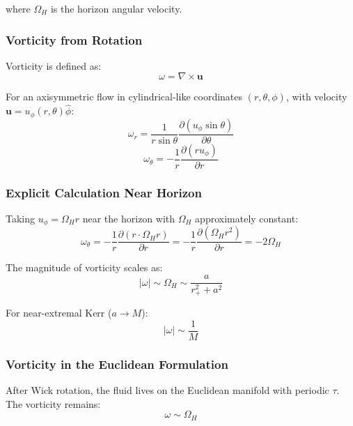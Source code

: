 \documentclass[11pt]{article}
\begin{document}
where $\Omega_H$ is the horizon angular velocity.

\subsubsection{Vorticity from Rotation}

Vorticity is defined as:
\begin{equation}
\omega = \nabla \times \mathbf{u}
\end{equation}

For an axisymmetric flow in cylindrical-like coordinates $(r, \theta, \phi)$, with velocity $\mathbf{u} = u_\phi(r,\theta)\hat{\phi}$:
\begin{equation}
\omega_r = \frac{1}{r\sin\theta}\frac{\partial(u_\phi \sin\theta)}{\partial\theta}
\end{equation}
\begin{equation}
\omega_\theta = -\frac{1}{r}\frac{\partial(r u_\phi)}{\partial r}
\end{equation}

\subsubsection{Explicit Calculation Near Horizon}

Taking $u_\phi = \Omega_H r$ near the horizon with $\Omega_H$ approximately constant:
\begin{equation}
\omega_\theta = -\frac{1}{r}\frac{\partial(r \cdot \Omega_H r)}{\partial r} = -\frac{1}{r}\frac{\partial(\Omega_H r^2)}{\partial r} = -2\Omega_H
\end{equation}

The magnitude of vorticity scales as:
\begin{equation}
|\omega| \sim \Omega_H \sim \frac{a}{r_+^2 + a^2}
\end{equation}

For near-extremal Kerr ($a \to M$):
\begin{equation}
|\omega| \sim \frac{1}{M}
\end{equation}

\subsubsection{Vorticity in the Euclidean Formulation}

After Wick rotation, the fluid lives on the Euclidean manifold with periodic $\tau$. The vorticity remains:
\begin{equation}
\omega \sim \Omega_H
\end{equation}
\end{document}

